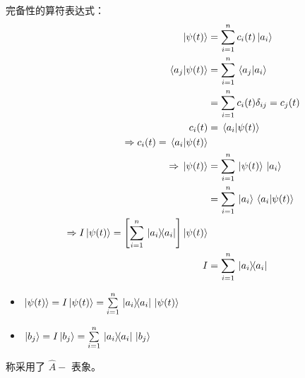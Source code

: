 完备性的算符表达式：
\[
    \begin{aligned}
        \ket*{\psi(t)}&=\sum\limits_{i=1}^{n}c_i(t)\ket*{a_i}\\ 
        \braket*{a_j}{\psi(t)}&=\sum\limits_{i=1}^{n}\braket*{a_j}{a_i}\\ 
        &=\sum\limits_{i=1}^{n}c_i(t)\delta_{ij}=c_j(t)\\ 
        c_i(t)&=\braket*{a_i}{\psi(t)}  \\ 
        \Rightarrow c_i(t)=\braket*{a_i}{\psi(t)}\\ 
        \Rightarrow \ket*{\psi(t)}&=\sum\limits_{i=1}^{n}\ket*{\psi(t)}\ket*{a_i}\\
        &=\sum\limits_{i=1}^{n}\ket*{a_i}\braket*{a_i}{\psi(t)}\\ 
        \Rightarrow I\ket*{\psi(t)}=\qty[\sum\limits_{i=1}^{n}\ketbra*{a_i}{a_i}]\ket*{\psi(t)}\\ 
        I&=\sum\limits_{i=1}^{n}\ketbra*{a_i}{a_i}
    \end{aligned}
\]
\begin{itemize}
    \item  \( \ket*{\psi(t)}=I\ket*{\psi(t)}=\sum\limits_{i=1}^{n}\ketbra*{a_i}{a_i}\ket*{\psi(t)} \) 
    \item  \( \ket*{b_j}=I\ket*{b_j}=\sum\limits_{i=1}^{n}\ketbra*{a_i}{a_i}\ket*{b_j} \)   
\end{itemize}
称采用了 \( \hat{A}- \) 表象。

